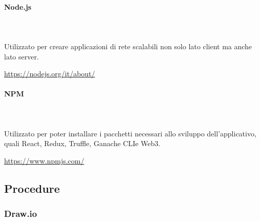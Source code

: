 		\paragraph{Node.js} \mbox{}\\ \mbox{}\\
		Utilizzato per creare applicazioni di rete scalabili non solo lato client ma anche lato server.\\
		\centerline{\url{https://nodejs.org/it/about/}}
		
		\paragraph{NPM} \mbox{}\\ \mbox{}\\
		Utilizzato per poter installare i pacchetti necessari allo sviluppo dell'applicativo, quali React\glo, Redux\glo, Truffle\glo, Ganache CLI\glosp e Web3\glo. \\
		\centerline{\url{https://www.npmjs.com/}}
		
	\subsection{Procedure}
	\subsubsection{Draw.io} 
